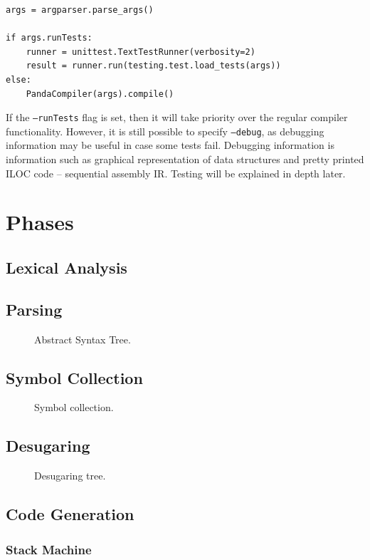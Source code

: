 \begin{verbatim}
args = argparser.parse_args()

if args.runTests:
    runner = unittest.TextTestRunner(verbosity=2)
    result = runner.run(testing.test.load_tests(args))
else:
    PandaCompiler(args).compile()
\end{verbatim}

If the \texttt{--runTests} flag is set, then it will take priority over the regular compiler functionality. However, it is still possible to specify \texttt{--debug}, as debugging information may be useful in case some tests fail. Debugging information is information such as graphical representation of data structures and pretty printed ILOC code -- sequential assembly IR. Testing will be explained in depth later.

\chapter{Phases}
\section{Lexical Analysis}
\newpage
\section{Parsing}
\begin{figure}[H]
    \centering
    
    \caption{Abstract Syntax Tree.} 
\end{figure}
\newpage
\section{Symbol Collection}
\begin{figure}[H]
    \centering
    
    \caption{Symbol collection.} 
\end{figure}
\newpage
\section{Desugaring}
\begin{figure}[H]
    \centering
    
    \caption{Desugaring tree.} 
\end{figure}
\newpage
\section{Code Generation} 
\subsection{Stack Machine}
